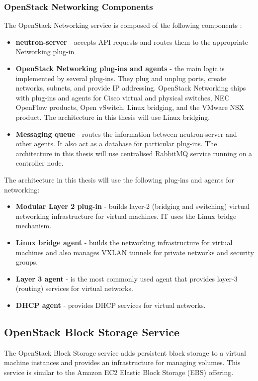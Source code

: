 \subsubsection*{OpenStack Networking Components}
The OpenStack Networking service is composed of the following components \cite{InstallGuide}:
\begin{itemize}
  \item{\textbf{neutron-server} - accepts API requests and routes them to the appropriate Networking plug-in}
  \item{\textbf{OpenStack Networking plug-ins and agents} - the main logic is implemented by several plug-ins. They plug and unplug ports, create networks, subnets, and provide IP addressing. OpenStack Networking ships with plug-ins and agents for Cisco virtual and physical switches, NEC OpenFlow products, Open vSwitch, Linux bridging, and the VMware NSX product. The architecture in this thesis will use Linux bridging.}
  \item{\textbf{Messaging queue} - routes the information between neutron-server and other agents. It also act as a database for particular plug-ins. The architecture in this thesis will use centralised RabbitMQ service running on a controller node.}
\end{itemize}

The architecture in this thesis will use the following plug-ins and agents for networking:
\begin{itemize}
  \item{\textbf{Modular Layer 2 plug-in} - builds layer-2 (bridging and switching) virtual networking infrastructure for virtual machines. IT uses the Linux bridge mechanism.}
  \item{\textbf{Linux bridge agent} - builds the networking infrastructure for virtual machines and also manages VXLAN tunnels for private networks and security groups.}
  \item{\textbf{Layer 3 agent} - is the most commonly used agent that provides layer-3 (routing) services for virtual networks.}
  \item{\textbf{DHCP agent} - provides DHCP services for virtual networks.}
\end{itemize}







\subsection{OpenStack Block Storage Service}
The OpenStack Block Storage service adds persistent block storage to a virtual machine instances and provides an infrastructure for managing volumes. This service is similar to the Amazon EC2 Elastic Block Storage (EBS) offering.

